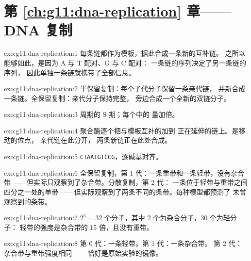 \section*{第 \ref{ch:g11:dna-replication} 章——DNA 复制}

\begin{solution}{exo:g11:dna-replication:1}
每条链都作为模板，据此合成一条新的互补链。
之所以能够如此，是因为 A 与 T 配对、G 与 C 配对：
一条链的序列决定了另一条链的序列，
因此单独一条链就携带了全部信息。
\end{solution}

\begin{solution}{exo:g11:dna-replication:2}
半保留复制：每个子代分子保留一条亲代链，
并新合成一条链。全保留复制：亲代分子保持完整，
旁边合成一个全新的双链分子。
\end{solution}

\begin{solution}{exo:g11:dna-replication:3}
周期的 S 期；每个中的  量加倍。
\end{solution}

\begin{solution}{exo:g11:dna-replication:4}
 聚合酶逐个把与模板互补的加到
正在延伸的链上。是移动的位点，
亲代链在此分开，
两条新链正在此处合成。
\end{solution}

\begin{solution}{exo:g11:dna-replication:5}
\texttt{CTAATGTCCG}，逐碱基对齐。
\end{solution}

\begin{solution}{exo:g11:dna-replication:6}
全保留复制，第 1 代：一条重带和一条轻带，没有杂合带
——但实际只观察到了杂合带。分散复制，第 2 代：
一条位于轻带与重带之间四分之一处的单带
——但实际观察到了两条不同的条带。每种模型都预测了
未曾观察到的条带。
\end{solution}

\begin{solution}{exo:g11:dna-replication:7}
$2^5 = 32$ 个分子，其中 2 个为杂合分子，30 个为轻分子：
轻带的强度是杂合带的 15 倍，且没有重带。
\end{solution}

\begin{solution}{exo:g11:dna-replication:8}
第 0 代：一条轻带。第 1 代：一条杂合带。
第 2 代：杂合带与重带强度相同——
恰好是原始实验的镜像。
\end{solution}

